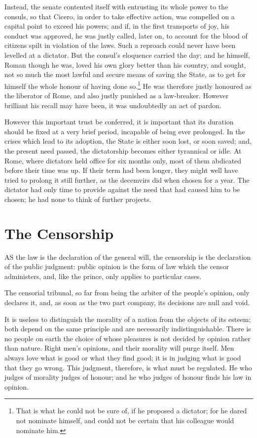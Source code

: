 \documentclass[12pt]{report}
\begin{document}
Instead, the senate contented itself with entrusting its whole power to the consuls, so that Cicero, in order to take effective action, was compelled on a capital point to exceed his powers; and if, in the first transports of joy, his conduct was approved, he was justly called, later on, to account for the blood of citizens spilt in violation of the laws. Such a reproach could never have been levelled at a dictator. But the consul's eloquence carried the day; and he himself, Roman though he was, loved his own glory better than his country, and sought, not so much the most lawful and secure means of saving the State, as to get for himself the whole honour of having done so.\footnote{That is what he could not be sure of, if he proposed a dictator; for he dared not nominate himself, and could not be certain that his colleague would nominate him.} He was therefore justly honoured as the liberator of Rome, and also justly punished as a law-breaker. However brilliant his recall may have been, it was undoubtedly an act of pardon.

However this important trust be conferred, it is important that its duration should be fixed at a very brief period, incapable of being ever prolonged. In the crises which lead to its adoption, the State is either soon lost, or soon saved; and, the present need passed, the dictatorship becomes either tyrannical or idle. At Rome, where dictators held office for six months only, most of them abdicated before their time was up. If their term had been longer, they might well have tried to prolong it still further, as the decemvirs did when chosen for a year. The dictator had only time to provide against the need that had caused him to be chosen; he had none to think of further projects.

\section{The Censorship}
AS the law is the declaration of the general will, the censorship is the declaration of the public judgment: public opinion is the form of law which the censor administers, and, like the prince, only applies to particular cases.

The censorial tribunal, so far from being the arbiter of the people's opinion, only declares it, and, as soon as the two part company, its decisions are null and void.

It is useless to distinguish the morality of a nation from the objects of its esteem; both depend on the same principle and are necessarily indistinguishable. There is no people on earth the choice of whose pleasures is not decided by opinion rather than nature. Right men's opinions, and their morality will purge itself. Men always love what is good or what they find good; it is in judging what is good that they go wrong. This judgment, therefore, is what must be regulated. He who judges of morality judges of honour; and he who judges of honour finds his law in opinion.
\end{document}
